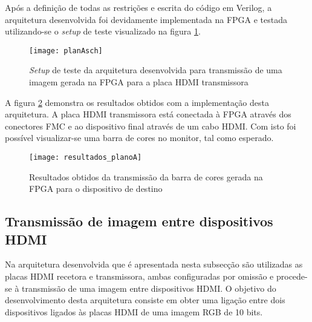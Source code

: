 Após a definição de todas as restrições e escrita do código em Verilog, a arquitetura desenvolvida foi devidamente implementada na FPGA e testada utilizando-se o \textit{setup} de teste visualizado na figura \ref{fig:planA_sch}.

\begin{figure}[h!]
	\begin{center}
		\leavevmode
		\texttt{[image: planAsch]}
		\caption{\textit{Setup} de teste da arquitetura desenvolvida para transmissão de uma imagem gerada na FPGA para a placa HDMI transmissora}
		\label{fig:planA_sch}
	\end{center}
\end{figure}

A figura \ref{fig:resultados_planoA} demonstra os resultados obtidos com a implementação desta arquitetura. A placa HDMI transmissora está conectada à FPGA através dos conectores FMC e ao dispositivo final através de um cabo HDMI. Com isto foi possível visualizar-se uma barra de cores no monitor, tal como esperado.

\begin{figure}[h!]
	\begin{center}
		\leavevmode
		\texttt{[image: resultados\_planoA]}
		\caption[Resultados obtidos da transmissão da barra de cores gerada na FPGA para o dispositivo de destino]{Resultados obtidos da transmissão da barra de cores gerada na FPGA para o dispositivo de destino}
		\label{fig:resultados_planoA}
	\end{center}
\end{figure}


\begin{center}
\end{center}



\subsection{Transmissão de imagem entre dispositivos HDMI} \label{subsub:planB}

Na arquitetura desenvolvida que é apresentada nesta subsecção são utilizadas as placas HDMI recetora e transmissora, ambas configuradas por omissão e procede-se à transmissão de uma imagem entre dispositivos HDMI. O objetivo do desenvolvimento desta arquitetura consiste em obter uma ligação entre dois dispositivos ligados às placas HDMI de uma imagem RGB de 10 bits.

